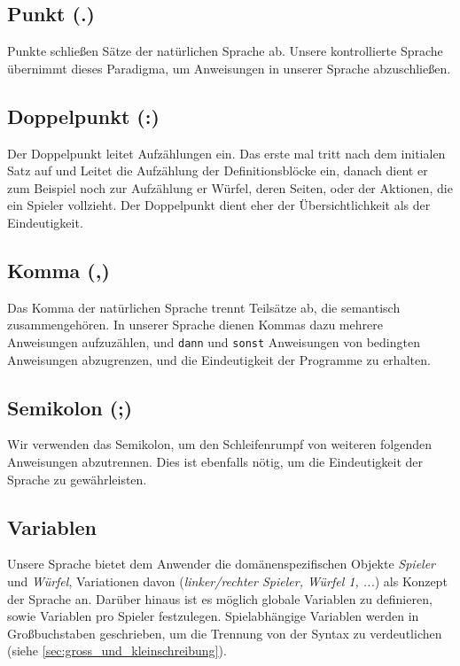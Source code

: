         \subsection{Punkt (.)} %
        \label{sub:punkt}
            Punkte schließen Sätze der natürlichen Sprache ab. Unsere kontrollierte Sprache übernimmt dieses Paradigma, um Anweisungen in unserer Sprache abzuschließen. 
        \subsection{Doppelpunkt (:)} %
        \label{sub:doppelpunkt}
            Der Doppelpunkt leitet Aufzählungen ein. Das erste mal tritt nach dem initialen Satz auf und Leitet die Aufzählung der Definitionsblöcke ein, danach dient er zum Beispiel noch zur Aufzählung er Würfel, deren Seiten, oder der Aktionen, die ein Spieler vollzieht. Der Doppelpunkt dient eher der Übersichtlichkeit als der Eindeutigkeit.
        \subsection{Komma (,)} %
        \label{sub:komma}
            Das Komma der natürlichen Sprache trennt Teilsätze ab, die semantisch zusammengehören. In unserer Sprache dienen Kommas dazu mehrere Anweisungen aufzuzählen, und \texttt{dann} und \texttt{sonst} Anweisungen von bedingten Anweisungen abzugrenzen, und die Eindeutigkeit der Programme zu erhalten. 
        \subsection{Semikolon (;)} %
        \label{sub:semikolon}
            Wir verwenden das Semikolon, um den Schleifenrumpf von weiteren folgenden Anweisungen abzutrennen. Dies ist ebenfalls nötig, um die Eindeutigkeit der Sprache zu gewährleisten.
    \subsection{Variablen} %
    \label{sub:variablen}
        Unsere Sprache bietet dem Anwender die domänenspezifischen Objekte \emph{Spieler} und \emph{Würfel}, Variationen davon (\emph{linker/rechter Spieler, Würfel 1, ...}) als Konzept der Sprache an. Darüber hinaus ist es möglich globale Variablen zu definieren, sowie Variablen pro Spieler festzulegen. Spielabhängige Variablen werden in Großbuchstaben geschrieben, um die Trennung von der Syntax zu verdeutlichen (siehe \ref{sec:gross_und_kleinschreibung}).
